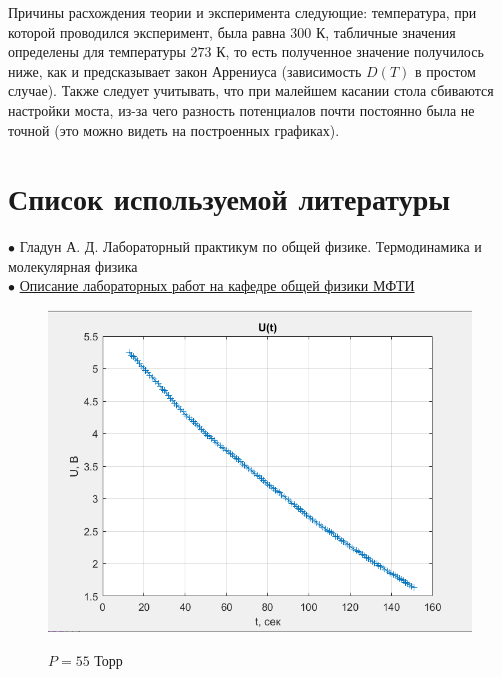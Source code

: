 \documentclass[a4paper, 12pt]{article} %
\begin{document}
Причины расхождения теории и эксперимента следующие: температура, при которой проводился эксперимент, была равна $300$ К, табличные значения определены для температуры $273$ К, то есть полученное значение получилось ниже, как и предсказывает закон Аррениуса (зависимость $D(T)$ в простом случае). Также следует учитывать, что при малейшем касании стола сбиваются настройки моста, из-за чего разность потенциалов почти постоянно была не точной (это можно видеть на построенных графиках).


\section{Список используемой литературы}

$\bullet$ Гладун А. Д. Лабораторный практикум по общей физике. Термодинамика и молекулярная физика\\

$\bullet$ \href{https://mipt.ru/education/chair/physics/S_II/lab/}{Описание лабораторных работ на кафедре общей физики МФТИ}

\newpage
\begin{figure}[h]
    \centering
    \includegraphics[width = 12 cm]{1gr55}
    \label{fig:vac}
    
    \begin{center}
        \caption{$P = 55$ Торр}
    \end{center}
\end{figure} 
\end{document}
